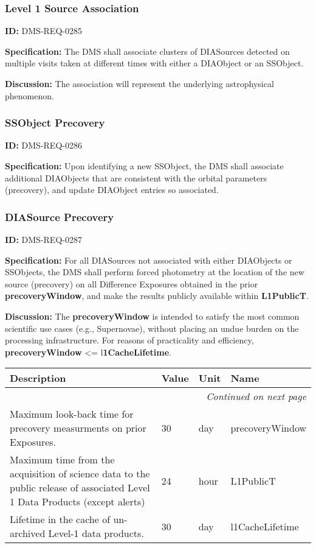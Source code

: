 \documentclass[SE,toc,lsstdraft]{lsstdoc}
\makeatletter
\newcommand{\paramname}[1]{\hspace{0pt}#1}
\newcommand{\unitname}[1]{\hspace{0pt}#1}
\newenvironment{parameters}[0]{%
\setlength\LTleft{0pt}
\setlength\LTright{\fill}
\begin{small}
\begin{longtable}[]{|p{0.5\textwidth}|l|p{0.6in}|p{1.74in}@{}|}

\hline \textbf{Description} & \textbf{Value} & \textbf{Unit} & \textbf{Name} \\ \hline
\endhead

\hline \multicolumn{4}{r}{\emph{Continued on next page}} \\
\endfoot

\hline\hline
\endlastfoot
}{%
\hline
\end{longtable}
\end{small}
}
\makeatother
\begin{document}
\subsubsection{Level 1 Source Association}

\label{DMS-REQ-0285}
\textbf{ID:} DMS-REQ-0285

\textbf{Specification:} The DMS shall associate clusters of DIASources detected on multiple visits taken at different times with either a DIAObject or an SSObject.

\textbf{Discussion: }The association will represent the underlying astrophysical phenomenon.




\subsubsection{SSObject Precovery}

\label{DMS-REQ-0286}
\textbf{ID:} DMS-REQ-0286

\textbf{Specification:} Upon identifying a new SSObject, the DMS shall associate additional DIAObjects that are consistent with the orbital parameters (precovery), and update DIAObject entries so associated.






\subsubsection{DIASource Precovery}

\label{DMS-REQ-0287}
\textbf{ID:} DMS-REQ-0287

\textbf{Specification:} For all DIASources not associated with either DIAObjects or SSObjects, the DMS shall perform forced photometry at the location of the new source (precovery) on all Difference Exposures obtained in the prior \textbf{precoveryWindow}, and make the results publicly available within \textbf{L1PublicT}.

\textbf{Discussion: }The \textbf{precoveryWindow }is intended to satisfy the most common scientific use cases (e.g., Supernovae), without placing an undue burden on the processing infrastructure.  For reasons of practicality and efficiency, \textbf{precoveryWindow }<= l\textbf{1CacheLifetime}.



\begin{parameters}
Maximum look-back time for precovery measurments on prior Exposures.
&
30
&
\unitname{%
day
}
&
\paramname{%
precoveryWindow
} \\\hline
Maximum time from the acquisition of science data to the public release of associated Level 1 Data Products (except alerts)
&
24
&
\unitname{%
hour
}
&
\paramname{%
L1PublicT
} \\\hline
Lifetime in the cache of un-archived Level-1 data products.
&
30
&
\unitname{%
day
}
&
\paramname{%
l1CacheLifetime
} \\\hline
\end{parameters}
\end{document}
